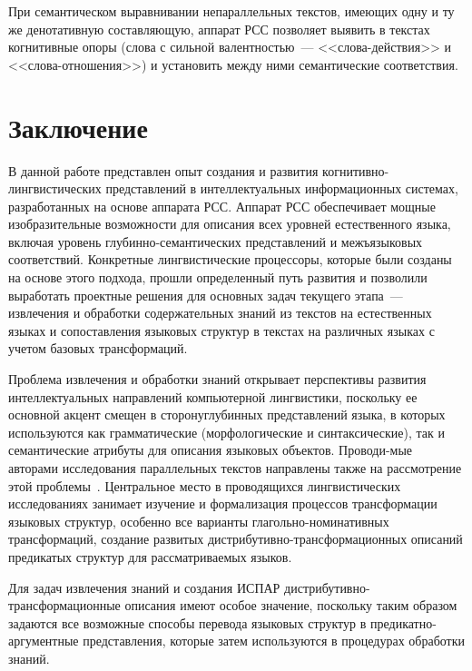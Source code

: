 \begin{multicols}{2}
     При семантическом выравнивании непараллельных текстов, имеющих 
одну и ту же денотативную составляющую, аппарат РСС позволяет выявить в 
текстах когнитивные опоры (слова с сильной валентностью~--- 
     <<сло\-ва-дейст\-вия>> и <<сло\-ва-от\-но\-ше\-ния>>) и установить 
между ними семантические соответствия.

\section{Заключение}

     В данной работе представлен опыт создания и развития 
     когни\-тив\-но-линг\-ви\-сти\-че\-ских пред\-став\-ле\-ний в 
интеллектуальных информационных сис\-те\-мах, разработанных на основе 
аппарата РСС. Аппарат РСС 
обеспечивает мощные изобразительные возможности для описания всех 
уровней естественного языка, включая уровень 
     глу\-бин\-но-се\-ман\-ти\-че\-ских представлений и межъязыковых 
соответствий. Конкретные лингвистические процессоры, которые были 
созданы на основе этого подхода, прошли определенный путь развития и 
позволили выработать проектные решения для основных задач текущего 
этапа~--- извлечения и обработки содержательных знаний из текстов на 
естественных языках и сопоставления языковых структур в текстах на 
различных языках с учетом базовых трансформаций.
     
     Проблема извлечения и обработки знаний открывает перспективы 
развития интеллектуальных направлений компьютерной лингвистики, 
поскольку ее основной акцент смещен в сторону\linebreak глубинных представлений 
языка, в которых используются как грамматические (морфологические и 
синтаксические), так и семантические атрибуты для описания языковых 
объектов. Проводи-\linebreak мые авторами исследования параллельных текстов 
направлены также на рассмотрение этой проблемы~\cite{20koz}. 
Центральное место в проводящихся линг\-ви\-сти\-че\-ских исследованиях 
занимает изучение и формализация процессов трансформации языковых 
структур, особенно все варианты глагольно-но\-ми\-на\-тив\-ных трансформаций, 
создание развитых дис\-три\-бу\-тив\-но-транс\-фор\-ма\-ци\-он\-ных 
описаний предикатых структур для рассматриваемых языков. 
     
     Для задач извлечения знаний и создания \mbox{ИСПАР} 
     дис\-три\-бу\-тив\-но-транс\-фор\-ма\-ци\-он\-ные описания имеют 
особое значение, поскольку таким образом задаются все возможные способы 
перевода языковых структур в пре\-ди\-кат\-но-ар\-гу\-мент\-ные 
представления, которые затем используются в процедурах обработки знаний.


\end{multicols}

